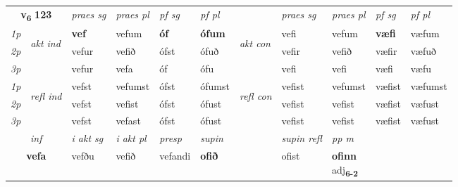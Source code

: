 \noindent
\begin{tabular}{lllllllllll} \toprule
\multicolumn{2}{c}{\textbf{v{\textsubscript{6}}} \Large{\textbf{123}}}  &  \textit{praes sg}  & \textit{praes pl}  &\textit{ pf sg} & \textit{pf pl} &  &  \textit{praes sg}  & \textit{praes pl}  & \textit{pf sg} & \textit{pf pl } \\*
	\cmidrule{3-6} \cmidrule{8-11}
 {\textit{1p}} & \multirow{3}{*}{\begin{turn}{90}\textit{akt ind}\end{turn}} & \textbf{vef} & vefum & \textbf{óf} & \textbf{ófum} & \multirow{3}{*}{\begin{turn}{90}\textit{akt con}\end{turn}} &vefi & vefum & \textbf{væfi} & væfum\\*
 {\textit{2p}} &  &  vefur  & vefið & ófst & ófuð & & vefir & vefið & væfir & væfuð \\*
{\textit{3p}} &  & vefur & vefa & óf & ófu & & vefi & vefi& væfi & væfu \\*
\cmidrule{3-6} \cmidrule{8-11}
 {\textit{1p}} & \multirow{3}{*}{\begin{turn}{90}\textit{refl ind}\end{turn}}  & vefst & vefumst & ófst & ófumst & \multirow{3}{*}{\begin{turn}{90}\textit{refl con}\end{turn}}  &vefist & vefumst & væfist & væfumst \\*
 {\textit{2p}} &  & vefst & vefist & ófst & ófust & &vefist & vefist & væfist & væfust \\*
 {\textit{3p}}  & & vefst & vefast & ófst & ófust & & vefist & vefist& væfist & væfust \\*
\cmidrule{3-6} \cmidrule{8-11}

   \multicolumn{2}{c}{\textit{inf}}  & \textit{i akt sg} & \textit{i akt pl}   & \textit{presp} & \textit{supin} && \textit{supin refl} & \textit{pp m} \\*
  \multicolumn{2}{c}{\textbf{vefa}} & vefðu  & vefið   & vefandi &  \textbf{ofið} && ofist & \specialcell{\textbf{ofinn} \\ adj\textbf{\textsubscript{6-2}}} \\*
\end{tabular}

